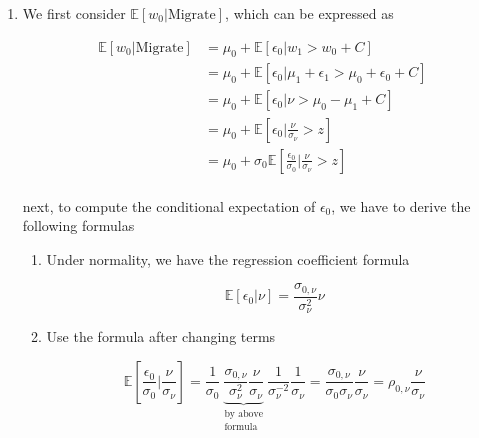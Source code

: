 \documentclass[11pt]{article}
\newcommand{\ept}{\mathbb{E}}
\begin{document}
        \begin{enumerate}

            \item We first consider $\ept[w_0 | \text{Migrate}]$, which can be expressed as

                \[\begin{aligned}
                    \ept[w_0 | \text{Migrate}] &= \mu_0 + \ept[\epsilon_0 | w_1 > w_0 + C]  \\
                                               &= \mu_0 + \ept[\epsilon_0 | \mu_1 + \epsilon_1 > \mu_0 + \epsilon_0 + C]  \\
                                               &= \mu_0 + \ept[\epsilon_0 | \nu > \mu_0 - \mu_1 + C]  \\
                                               &= \mu_0 + \ept[\epsilon_0 | \frac{\nu}{\sigma_\nu} > z]  \\
                                               &= \mu_0 + \sigma_0\ept[\frac{\epsilon_0}{\sigma_0} | \frac{\nu}{\sigma_\nu} > z]  \\
                \end{aligned}\]

            next, to compute the conditional expectation of $\epsilon_0$, we have to derive the following formulas

            \begin{enumerate}

                \item Under normality, we have the regression coefficient formula
                
                \[
                    \ept[\epsilon_0 | \nu] = \frac{\sigma_{0,\nu}}{\sigma_\nu^2}\nu    
                \]

                \item Use the formula after changing terms
                
                \begin{equation}
                    \ept[\frac{\epsilon_0}{\sigma_0} | \frac{\nu}{\sigma_\nu}] 
                    = \frac{1}{\sigma_0} \underbrace{\frac{\sigma_{0,\nu}}{\sigma_\nu^2}\frac{\nu}{\sigma_\nu}}_{\substack{\text{by above}\\\text{formula}}} \frac{1}{\sigma^{-2}_\nu}\frac{1}{\sigma_\nu}
                    = \frac{\sigma_{0,\nu}}{\sigma_0\sigma_\nu}\frac{\nu}{\sigma_\nu}
                    = \rho_{0,\nu}\frac{\nu}{\sigma_\nu}
                \end{equation}


\end{enumerate}
\end{enumerate}
\end{document}
